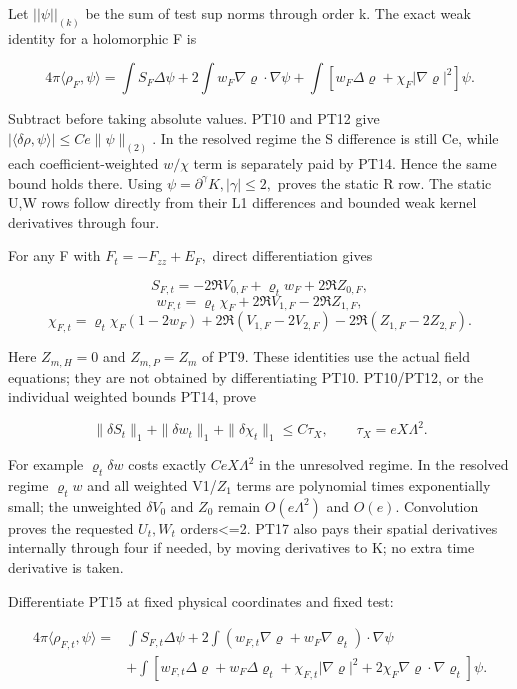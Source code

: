 Let \(||\psi||_{(k)}\) be the sum of test sup norms through order k. The exact weak identity for a holomorphic F is

\[
4\pi\langle\rho_F,\psi\rangle
=\int S_F\Delta\psi+2\int w_F\nabla\varrho\cdot\nabla\psi
 +\int[w_F\Delta\varrho+\chi_F|\nabla\varrho|^2]\psi.
\tag{PT15}\label{eq:ansatz-pt15}
\]

Subtract before taking absolute values. PT10 and PT12 give $|\langle\delta\rho,\psi\rangle|\le Ce\|\psi\|_{(2)}$. In the resolved regime the S difference is still Ce, while each coefficient-weighted \(w/\chi\) term is separately paid by PT14. Hence the same bound holds there. Using \(\psi=\partial^{\gamma} K, |\gamma|\le 2,\) proves the static R row. The static U,W rows follow directly from their L1 differences and bounded weak kernel derivatives through four.

For any F with \(F_{t}=-F_{zz}+E_{F},\) direct differentiation gives

\[
S_{F,t}=-2\Re V_{0,F}+\varrho_t w_F+2\Re Z_{0,F},
\]
\[
w_{F,t}=\varrho_t\chi_F+2\Re V_{1,F}-2\Re Z_{1,F},
\]
\[
\chi_{F,t}=\varrho_t\chi_F(1-2w_F)
  +2\Re(V_{1,F}-2V_{2,F})-2\Re(Z_{1,F}-2Z_{2,F}).
\tag{PT16}\label{eq:ansatz-pt16}
\]

Here \(Z_{m,H}=0\) and \(Z_{m,P}=Z_{m}\) of PT9. These identities use the actual field equations; they are not obtained by differentiating PT10. PT10/PT12, or the individual weighted bounds PT14, prove

\[
\|\delta S_t\|_1+\|\delta w_t\|_1+
       \|\delta\chi_t\|_1\le C\tau_X,\qquad
\tau_X=e X\Lambda^2.
\tag{PT17}\label{eq:ansatz-pt17}
\]

For example \(\varrho_{t} \delta w\) costs exactly \(Ce X \Lambda^{2}\) in the unresolved regime. In the resolved regime \(\varrho_{t} w\) and all weighted V1/$Z_1$ terms are polynomial times exponentially small; the unweighted \(\delta V_{0}\) and $Z_0$ remain \(O(e \Lambda^{2})\) and \(O(e).\) Convolution proves the requested \(U_{t},W_{t}\) orders<=2. PT17 also pays their spatial derivatives internally through four if needed, by moving derivatives to K; no extra time derivative is taken.

Differentiate PT15 at fixed physical coordinates and fixed test:

\[
\begin{split}
4\pi\langle\rho_{F,t},\psi\rangle={}&\int S_{F,t}\Delta\psi
 +2\int(w_{F,t}\nabla\varrho+w_F\nabla\varrho_t)\cdot\nabla\psi\\
 &+\int[w_{F,t}\Delta\varrho+w_F\Delta\varrho_t
 +\chi_{F,t}|\nabla\varrho|^2
 +2\chi_F\nabla\varrho\cdot\nabla\varrho_t]\psi.
\end{split}
\tag{PT18}\label{eq:ansatz-pt18}
\]

